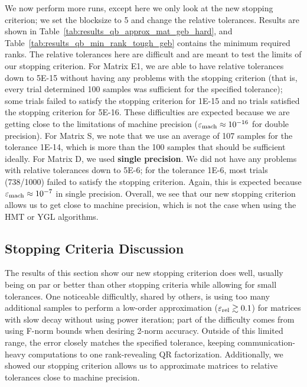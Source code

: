 We now perform more runs, except here we only look at the new
stopping criterion;
we set the blocksize to 5 and change the relative tolerances.
Results are shown in Table~\ref{tab:results_qb_approx_mat_geb_hard},
and Table~\ref{tab:results_qb_min_rank_tough_geb} contains the minimum
required ranks.
The relative tolerances here are difficult and are meant to test
the limits of our stopping criterion.
For Matrix E1, we are able to have relative tolerances down to
5E-15 without having any problems with the
stopping criterion (that is, every trial determined 100 samples
was sufficient for the specified tolerance);
some trials failed to satisfy the stopping criterion for 1E-15 and
no trials satisfied the stopping criterion for 5E-16.
These difficulties are expected because we are getting close to
the limitations of machine precision ($\varepsilon_{\text{mach}}\approx10^{-16}$
for double precision).
For Matrix S, we note that we use an average of 107 samples for
the tolerance 1E-14, which is more than the 100 samples that
should be sufficient ideally.
For Matrix D, we used \textbf{single precision}.
We did not have any problems with relative tolerances down
to 5E-6; for the tolerance 1E-6, most trials (738/1000) failed to
satisfy the stopping criterion.
Again, this is expected because $\varepsilon_{\text{mach}}\approx10^{-7}$ in single precision.
Overall, we see that our new stopping criterion allows us to get
close to machine precision, which is not the case
when using the HMT or YGL algorithms.









\subsection{Stopping Criteria Discussion}

The results of this section show our new stopping criterion does well,
usually being on par or better than other stopping criteria
while allowing for small tolerances.
One noticeable difficultly, shared by others, is using too many
additional samples to perform a low-order approximation
($\varepsilon_{\text{rel}}\gtrsim0.1$) for matrices with slow decay without using power iteration;
part of the difficulty comes from using F-norm
bounds when desiring 2-norm accuracy.
Outside of this limited range, the error closely matches
the specified tolerance, keeping communication-heavy computations
to one rank-revealing QR factorization.
Additionally, we showed our stopping criterion
allows us to approximate matrices to relative tolerances
close to machine precision.

